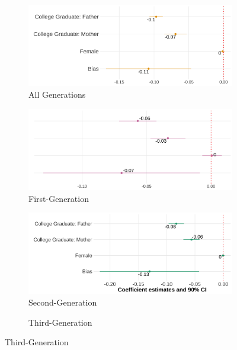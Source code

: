 \documentclass[12pt, fullpage]{article}
\begin{document}
\begin{center}
\begin{figure}[H]
\centering
\caption{Relationship Between Self-Reported Hispanic Identity and Bias: By Generation.}
\label{plot01-regression-gen}
\begin{subfigure}{.48\textwidth}
\caption{All Generations}
\centering
\includegraphics[width=.9\linewidth]{figure/skin-iat-regression-all-gens.png}
\end{subfigure}
\centering
\begin{subfigure}{.48\textwidth}
\caption{First-Generation}
\centering
\includegraphics[width=.9\linewidth]{figure/skin-iat-regression-first-gen.png}
\end{subfigure}
\begin{subfigure}{.48\textwidth}
\caption{Second-Generation}
\centering
\includegraphics[width=.9\linewidth]{figure/skin-iat-regression-second-gen.png}
\end{subfigure}
\begin{subfigure}{.48\textwidth}
\caption{Third-Generation}

\end{subfigure}
\end{figure}
\end{center}
\end{document}
